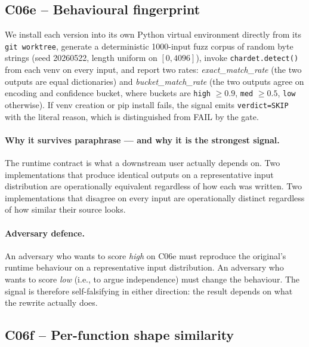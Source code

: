 \documentclass[11pt,letterpaper]{article}
\begin{document}
\subsection{C06e -- Behavioural fingerprint}
\label{sec:c06e}
We install each version into its own Python virtual environment
directly from its \texttt{git worktree}, generate a deterministic
1000-input fuzz corpus of random byte strings (seed 20260522, length
uniform on $[0, 4096]$), invoke \texttt{chardet.detect()} from each
venv on every input, and report two rates: \emph{exact\_match\_rate}
(the two outputs are equal dictionaries) and \emph{bucket\_match\_rate}
(the two outputs agree on encoding and confidence bucket, where
buckets are \texttt{high} $\ge 0.9$, \texttt{med} $\ge 0.5$,
\texttt{low} otherwise). If venv creation or pip install fails, the
signal emits \texttt{verdict=SKIP} with the literal reason, which is
distinguished from FAIL by the gate.

\paragraph{Why it survives paraphrase --- and why it is the
strongest signal.} The runtime contract is what a downstream user
actually depends on. Two implementations that produce identical
outputs on a representative input distribution are operationally
equivalent regardless of how each was written. Two implementations
that disagree on every input are operationally distinct regardless
of how similar their source looks.

\paragraph{Adversary defence.} An adversary who wants to score
\emph{high} on C06e must reproduce the original's runtime behaviour
on a representative input distribution. An adversary who wants to
score \emph{low} (i.e., to argue independence) must change the
behaviour. The signal is therefore self-falsifying in either
direction: the result depends on what the rewrite actually does.

\subsection{C06f -- Per-function shape similarity}
\label{sec:c06f}
\end{document}
